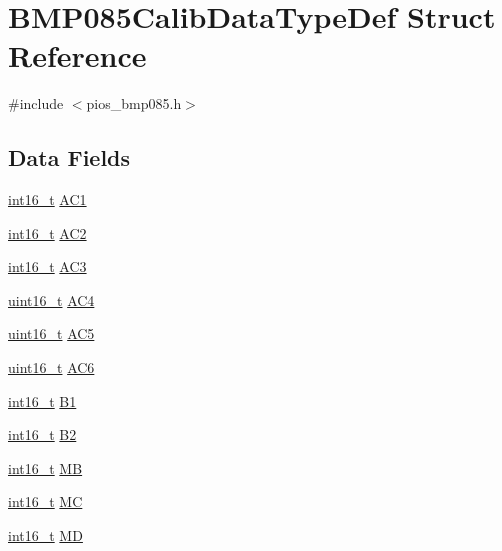 \hypertarget{struct_b_m_p085_calib_data_type_def}{\section{B\-M\-P085\-Calib\-Data\-Type\-Def Struct Reference}
\label{struct_b_m_p085_calib_data_type_def}
}


{\ttfamily \#include $<$pios\-\_\-bmp085.\-h$>$}

\subsection*{Data Fields}
\begin{DoxyCompactItemize}
\item 
\hyperlink{stdint_8h_aa343fa3b3d06292b959ffdd4c4703b06}{int16\-\_\-t} \hyperlink{struct_b_m_p085_calib_data_type_def_a161f72fdd77f428497ee05b818064f40}{A\-C1}
\item 
\hyperlink{stdint_8h_aa343fa3b3d06292b959ffdd4c4703b06}{int16\-\_\-t} \hyperlink{struct_b_m_p085_calib_data_type_def_ac4f5e67f3bb8b7302d1394e3e0fa60fa}{A\-C2}
\item 
\hyperlink{stdint_8h_aa343fa3b3d06292b959ffdd4c4703b06}{int16\-\_\-t} \hyperlink{struct_b_m_p085_calib_data_type_def_a482f54f54d2adcb6e34ec46f9ad621e0}{A\-C3}
\item 
\hyperlink{stdint_8h_a273cf69d639a59973b6019625df33e30}{uint16\-\_\-t} \hyperlink{struct_b_m_p085_calib_data_type_def_a4e595e57196b38e68364e6251350ac95}{A\-C4}
\item 
\hyperlink{stdint_8h_a273cf69d639a59973b6019625df33e30}{uint16\-\_\-t} \hyperlink{struct_b_m_p085_calib_data_type_def_aa844386cfe53dd2efeb4e3f4445282a1}{A\-C5}
\item 
\hyperlink{stdint_8h_a273cf69d639a59973b6019625df33e30}{uint16\-\_\-t} \hyperlink{struct_b_m_p085_calib_data_type_def_af89ddaa314bab8170726cd9ab0e6fc91}{A\-C6}
\item 
\hyperlink{stdint_8h_aa343fa3b3d06292b959ffdd4c4703b06}{int16\-\_\-t} \hyperlink{struct_b_m_p085_calib_data_type_def_a6f5c6e5cc70b5569922dc9c72fd80b6c}{B1}
\item 
\hyperlink{stdint_8h_aa343fa3b3d06292b959ffdd4c4703b06}{int16\-\_\-t} \hyperlink{struct_b_m_p085_calib_data_type_def_a895d74abbbe7071148feed73f8217a20}{B2}
\item 
\hyperlink{stdint_8h_aa343fa3b3d06292b959ffdd4c4703b06}{int16\-\_\-t} \hyperlink{struct_b_m_p085_calib_data_type_def_a3e2e7b4e98edcfceeb7af2c622db30e9}{M\-B}
\item 
\hyperlink{stdint_8h_aa343fa3b3d06292b959ffdd4c4703b06}{int16\-\_\-t} \hyperlink{struct_b_m_p085_calib_data_type_def_a1665d1134225ff27705293714f8301f6}{M\-C}
\item 
\hyperlink{stdint_8h_aa343fa3b3d06292b959ffdd4c4703b06}{int16\-\_\-t} \hyperlink{struct_b_m_p085_calib_data_type_def_a8bc67ebe1ea785684147c375ccc9b1be}{M\-D}
\end{DoxyCompactItemize}


